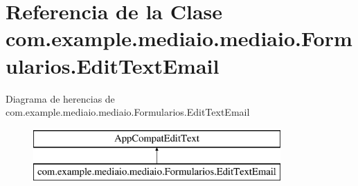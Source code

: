 \hypertarget{classcom_1_1example_1_1mediaio_1_1mediaio_1_1_formularios_1_1_edit_text_email}{}\section{Referencia de la Clase com.\+example.\+mediaio.\+mediaio.\+Formularios.\+Edit\+Text\+Email}
\label{classcom_1_1example_1_1mediaio_1_1mediaio_1_1_formularios_1_1_edit_text_email}
Diagrama de herencias de com.\+example.\+mediaio.\+mediaio.\+Formularios.\+Edit\+Text\+Email\begin{figure}[H]
\begin{center}
\leavevmode
\includegraphics[height=2.000000cm]{classcom_1_1example_1_1mediaio_1_1mediaio_1_1_formularios_1_1_edit_text_email}
\end{center}
\end{figure}

